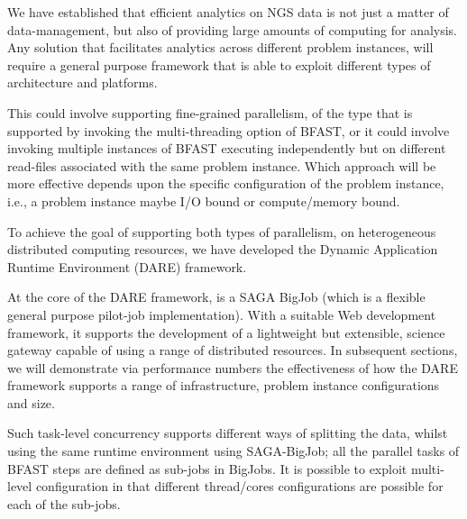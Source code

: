 \documentclass{cpeauth}
\begin{document}
We have established that efficient analytics on NGS data is not just a
matter of data-management, but also of providing large amounts of
computing for analysis. Any solution that facilitates analytics across
different problem instances, will require a general purpose framework
that is able to exploit different types of architecture and platforms.


 
This could involve supporting fine-grained parallelism, of the type
that is supported by invoking the multi-threading option of BFAST, or
it could involve invoking multiple instances of BFAST executing
independently but on different read-files associated with the same
problem instance. Which approach will be more effective depends upon
the specific configuration of the problem instance, i.e., a problem
instance maybe I/O bound or compute/memory bound.

To achieve the goal of supporting both types of parallelism, on
heterogeneous distributed computing resources, we have developed the
Dynamic Application Runtime Environment (DARE)
framework\cite{dareurl,dare-tg11,dare-ecmls11}.  

At the core of the DARE framework, is a SAGA BigJob (which is a
flexible general purpose pilot-job
implementation)\cite{saga-ccgrid10,saga-royalsoc,saga-web,jha2009developing,ecmls10}.
With a suitable Web development framework, it supports the development
of a lightweight but extensible, science gateway capable of using a
range of distributed resources.  In subsequent sections, we will
demonstrate via performance numbers the effectiveness of how the DARE
framework supports a range of infrastructure, problem instance
configurations and size.

Such task-level concurrency supports different ways of splitting the
data, whilst using the same runtime environment using SAGA-BigJob; all
the parallel tasks of BFAST steps are defined as sub-jobs in BigJobs.
It is possible to exploit multi-level configuration in that different
thread/cores configurations are possible for each of the sub-jobs.
\end{document}
